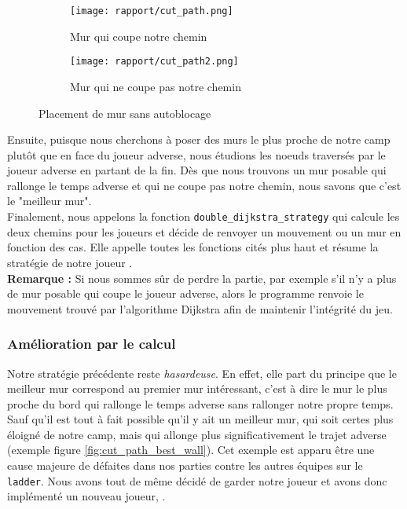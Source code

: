 \documentclass[a4paper]{article}
\begin{document}
\begin{figure}[ht]
    \centering
    \begin{subfigure}{.5\textwidth}
        \centering
        \texttt{[image: rapport/cut\_path.png]}
        \caption{Mur qui coupe notre chemin}
        \label{fig:cut_path1}
    \end{subfigure}%
    \begin{subfigure}{.5\textwidth}
        \centering
        \texttt{[image: rapport/cut\_path2.png]}
        \caption{Mur qui ne coupe pas notre chemin}
        \label{fig:cut_path2}
    \end{subfigure}%

    \caption{Placement de mur sans autoblocage}
    \label{fig:cut_path}
\end{figure}




Ensuite, puisque nous cherchons à poser des murs le plus proche de notre camp plutôt que en face du joueur adverse, nous étudions les noeuds traversés par le joueur adverse en partant de la fin. Dès que nous trouvons un mur posable qui rallonge le temps adverse et qui ne coupe pas notre chemin, nous savons que c'est le "meilleur mur". \\

Finalement, nous appelons la fonction \texttt{double\_dijkstra\_strategy} qui calcule les deux chemins pour les joueurs et décide de renvoyer un mouvement ou un mur en fonction des cas. Elle appelle toutes les fonctions cités plus haut et résume la stratégie de notre joueur . \\

\textbf{Remarque :} Si nous sommes sûr de perdre la partie, par exemple s'il n'y a plus de mur posable qui coupe le joueur adverse, alors le programme renvoie le mouvement trouvé par l'algorithme Dijkstra afin de maintenir l'intégrité du jeu.

\subsubsection{Amélioration par le calcul}

Notre stratégie précédente reste \textit{hasardeuse}. En effet, elle part du principe que le meilleur mur correspond au premier mur intéressant, c'est à dire le mur le plus proche du bord qui rallonge le temps adverse sans rallonger notre propre temps. Sauf qu'il est tout à fait possible qu'il y ait un meilleur mur, qui soit certes plus éloigné de notre camp, mais qui allonge plus significativement le trajet adverse (exemple figure \ref{fig:cut_path_best_wall}). Cet exemple est apparu être une cause majeure de défaites dans nos parties contre les autres équipes sur le \texttt{ladder}. Nous avons tout de même décidé de garder notre joueur  et avons donc implémenté un nouveau joueur, . \\
\end{document}
